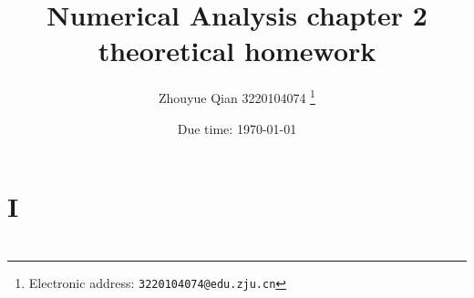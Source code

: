 \documentclass[a4paper]{article}
\begin{document}
\title{Numerical Analysis chapter 2 theoretical homework}

\author{Zhouyue Qian 3220104074
  \thanks{Electronic address: \texttt{3220104074@edu.zju.cn}}}


\date{Due time: \today}

\maketitle






\section*{I}


\section*{  }
\printbibliography
\end{document}
